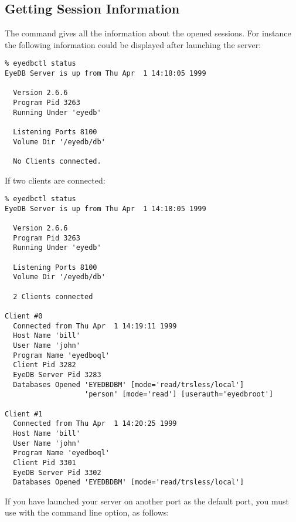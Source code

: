 \subsection{Getting Session Information}
The command  gives all the information about the
opened sessions. For instance the following information could be displayed
after launching the server:
\verbsize\begin{verbatim}
% eyedbctl status
EyeDB Server is up from Thu Apr  1 14:18:05 1999
 
  Version 2.6.6
  Program Pid 3263
  Running Under 'eyedb'
 
  Listening Ports 8100
  Volume Dir '/eyedb/db'
 
  No Clients connected.
\end{verbatim}\normalsize
If two  clients are connected:
\verbsize\begin{verbatim}
% eyedbctl status
EyeDB Server is up from Thu Apr  1 14:18:05 1999
 
  Version 2.6.6
  Program Pid 3263
  Running Under 'eyedb'
 
  Listening Ports 8100
  Volume Dir '/eyedb/db'
 
  2 Clients connected
 
Client #0
  Connected from Thu Apr  1 14:19:11 1999
  Host Name 'bill'
  User Name 'john'
  Program Name 'eyedboql'
  Client Pid 3282
  EyeDB Server Pid 3283
  Databases Opened 'EYEDBDBM' [mode='read/trsless/local']
                   'person' [mode='read'] [userauth='eyedbroot']
 
Client #1
  Connected from Thu Apr  1 14:20:25 1999
  Host Name 'bill'
  User Name 'john'
  Program Name 'eyedboql'
  Client Pid 3301
  EyeDB Server Pid 3302
  Databases Opened 'EYEDBDBM' [mode='read/trsless/local']
\end{verbatim}\normalsize
If you have launched your server on another port as the default port,
you must use  with the  command line option,
as follows:\\

